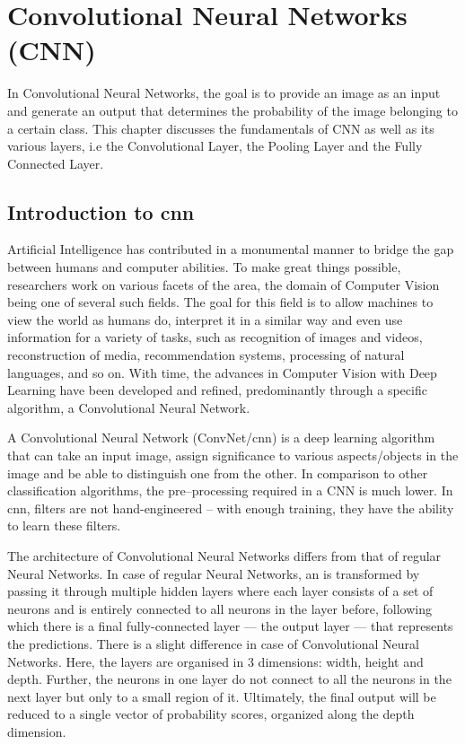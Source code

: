\chapter{Convolutional Neural Networks (CNN)}

In Convolutional Neural Networks, the goal is to provide an image as an input and generate an output that determines the probability of the image belonging to a certain class. This chapter discusses the fundamentals of CNN as well as its various layers, i.e the Convolutional Layer, the Pooling Layer and the Fully Connected Layer.
\section{Introduction to \acrlong{cnn}}

Artificial Intelligence has contributed in a monumental manner to bridge the gap between humans and computer abilities. To make great things possible, researchers work on various facets of the area, the domain of Computer Vision being one of several such fields. The goal for this field is to allow machines to view the world as humans do, interpret it in a similar way and even use information for a variety of tasks, such as recognition of images and videos, reconstruction of media, recommendation systems, processing of natural languages, and so on. With time, the advances in Computer Vision with Deep Learning have been developed and refined, predominantly through a specific algorithm, a Convolutional Neural Network.

A Convolutional Neural Network (ConvNet/\acrshort{cnn}) is a deep learning algorithm that can take an input image, assign significance to various aspects/objects in the image and be able to distinguish one from the other. In comparison to other classification algorithms, the pre--processing required in a CNN is much lower. In \acrshort{cnn}, filters are not hand-engineered -- with enough training, they have the ability to learn these filters. 

The architecture of Convolutional Neural Networks differs from that of regular Neural Networks. In case of regular Neural Networks, an  is transformed by passing it through multiple hidden layers where each layer consists of a set of neurons and is entirely connected to all neurons in the layer before, following which there is a final fully-connected layer — the output layer — that represents the predictions. There is a slight difference in case of Convolutional Neural Networks. Here, the layers are organised in 3 dimensions: width, height and depth. Further, the neurons in one layer do not connect to all the neurons in the next layer but only to a small region of it. Ultimately, the final output will be reduced to a single vector of probability scores, organized along the depth dimension.
